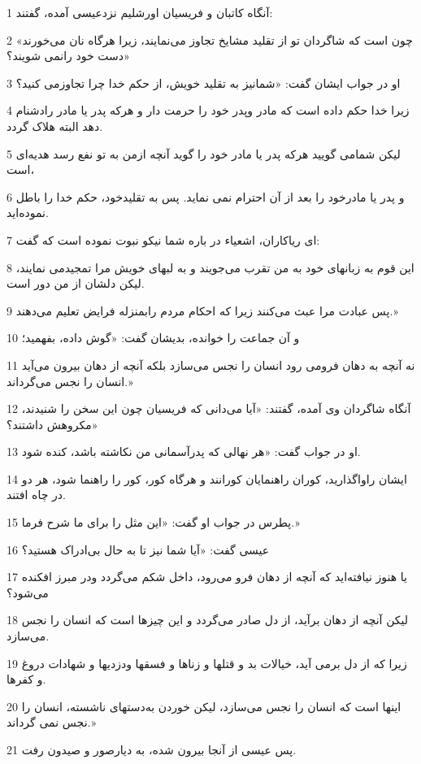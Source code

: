 \par 1 آنگاه کاتبان و فریسیان اورشلیم نزدعیسی آمده، گفتند:
\par 2 «چون است که شاگردان تو از تقلید مشایخ تجاوز می‌نمایند، زیرا هرگاه نان می‌خورند دست خود رانمی شویند؟»
\par 3 او در جواب ایشان گفت: «شمانیز به تقلید خویش، از حکم خدا چرا تجاوزمی کنید؟
\par 4 زیرا خدا حکم داده است که مادر وپدر خود را حرمت دار و هرکه پدر یا مادر رادشنام دهد البته هلاک گردد.
\par 5 لیکن شمامی گویید هر‌که پدر یا مادر خود را گوید آنچه ازمن به تو نفع رسد هدیه‌ای است،
\par 6 و پدر یا مادرخود را بعد از آن احترام نمی نماید. پس به تقلیدخود، حکم خدا را باطل نموده‌اید.
\par 7 ‌ای ریاکاران، اشعیاء در باره شما نیکو نبوت نموده است که گفت:
\par 8 این قوم به زبانهای خود به من تقرب می‌جویند و به لبهای خویش مرا تمجیدمی نمایند، لیکن دلشان از من دور است.
\par 9 پس عبادت مرا عبث می‌کنند زیرا که احکام مردم رابمنزله فرایض تعلیم می‌دهند.»
\par 10 و آن جماعت را خوانده، بدیشان گفت: «گوش داده، بفهمید؛
\par 11 نه آنچه به دهان فرومی رود انسان را نجس می‌سازد بلکه آنچه از دهان بیرون می‌آید انسان را نجس می‌گرداند.»
\par 12 آنگاه شاگردان وی آمده، گفتند: «آیا می‌دانی که فریسیان چون این سخن را شنیدند، مکروهش داشتند؟»
\par 13 او در جواب گفت: «هر نهالی که پدرآسمانی من نکاشته باشد، کنده شود.
\par 14 ایشان راواگذارید، کوران راهنمایان کورانند و هرگاه کور، کور را راهنما شود، هر دو در چاه افتند.
\par 15 پطرس در جواب او گفت: «این مثل را برای ما شرح فرما.»
\par 16 عیسی گفت: «آیا شما نیز تا به حال بی‌ادراک هستید؟
\par 17 یا هنوز نیافته‌اید که آنچه از دهان فرو می‌رود، داخل شکم می‌گردد ودر مبرز افکنده می‌شود؟
\par 18 لیکن آنچه از دهان برآید، از دل صادر می‌گردد و این چیزها است که انسان را نجس می‌سازد.
\par 19 زیرا که از دل برمی آید، خیالات بد و قتلها و زناها و فسقها ودزدیها و شهادات دروغ و کفرها.
\par 20 اینها است که انسان را نجس می‌سازد، لیکن خوردن به‌دستهای ناشسته، انسان را نجس نمی گرداند.»
\par 21 پس عیسی از آنجا بیرون شده، به دیارصور و صیدون رفت.
